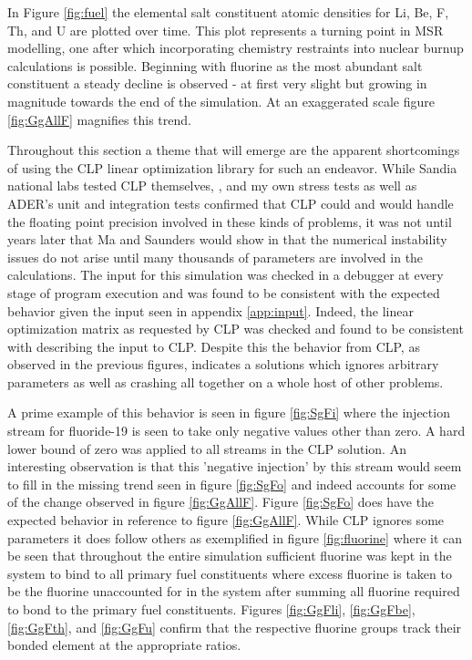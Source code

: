In Figure \ref{fig:fuel} the elemental salt constituent atomic
densities for Li, Be, F, Th, and U are plotted over time. This plot represents
a turning point in MSR modelling, one after which incorporating chemistry 
restraints into nuclear burnup calculations is possible. Beginning with fluorine
as the most abundant salt constituent a steady decline is observed - at first
very slight but growing in magnitude towards the end of the simulation. At an
exaggerated scale figure \ref{fig:GgAllF} magnifies this trend. 

Throughout this section a theme that will emerge are the apparent shortcomings
of using the CLP linear optimization library for such an endeavor. While Sandia
national labs tested CLP themselves, \cite{gearhart_comparison_2013}, and my
own stress tests as well as ADER's unit and integration tests confirmed that
CLP could and would handle the floating point precision involved in these kinds
of problems, it was not until years later that Ma and Saunders would show in
\cite{STANFORD} that the numerical instability issues do not arise until many
thousands of parameters are involved in the calculations. The input for this
simulation was checked in a debugger at every stage of program execution and was
found to be consistent with the expected behavior given the input seen in
appendix \ref{app:input}. Indeed, the linear optimization matrix as requested by
CLP was checked and found to be consistent with describing the input to CLP.
Despite this the behavior from CLP, as observed in the previous figures, 
indicates a solutions which ignores arbitrary parameters as well as crashing
all together on a whole host of other problems.

A prime example of this behavior is seen in figure \ref{fig:SgFi} where the
injection stream for fluoride-19 is seen to take only negative values other than
zero. A hard lower bound of zero was applied to all streams in the CLP solution.
An interesting observation is that this 'negative injection' by this stream
would seem to fill in the missing trend seen in figure \ref{fig:SgFo} and indeed
accounts for some of the change observed in figure \ref{fig:GgAllF}. Figure
\ref{fig:SgFo} does have the expected behavior in reference to figure
\ref{fig:GgAllF}. While CLP ignores some parameters it does follow others as
exemplified in figure \ref{fig:fluorine} where it can be seen that throughout
the entire simulation sufficient fluorine was kept in the system to bind to all
primary fuel constituents where excess fluorine is taken to be the fluorine 
unaccounted for in the system after summing all fluorine required to bond to the
primary fuel constituents. Figures \ref{fig:GgFli}, \ref{fig:GgFbe},
\ref{fig:GgFth}, and \ref{fig:GgFu} confirm that the respective fluorine
groups track their bonded element at the appropriate ratios.

